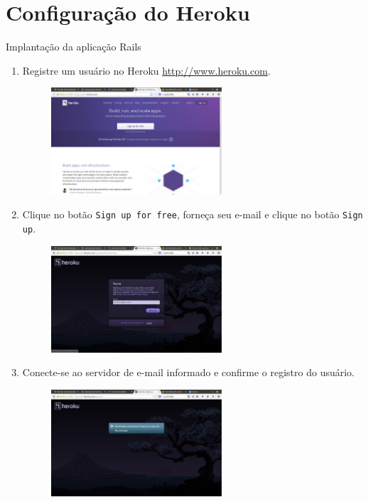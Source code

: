 \section{Configuração do Heroku}
\begin{frame}{Implantação da aplicação Rails}
  \begin{enumerate}
    \item Registre um usuário no Heroku \url{http://www.heroku.com}.
    \begin{figure}[h!]
	\centering
	\includegraphics[width=0.60\textwidth]{devops/imagens/heroku-1.png}
    \end{figure}
 
 \framebreak
    \item Clique no botão \verb!Sign up for free!, forneça seu e-mail e clique no botão
      \verb!Sign up!.
    \begin{figure}[h!]
	\centering
	\includegraphics[width=0.60\textwidth]{devops/imagens/heroku-2.png}
    \end{figure}

 \framebreak
    \item Conecte-se ao servidor de e-mail informado e confirme o registro do usuário.
    \begin{figure}[h!]
	\centering
	\includegraphics[width=0.60\textwidth]{devops/imagens/heroku-3.png}
    \end{figure}
 

\end{enumerate}
\end{frame}
